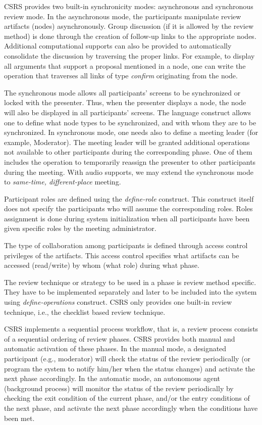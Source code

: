 CSRS provides two built-in synchronicity modes: asynchronous
and synchronous review mode. In the asynchronous mode, the
participants manipulate review artifacts (nodes) asynchronously.
Group discussion (if it is allowed by the review method) is done
through the creation of follow-up links to the appropriate nodes. 
Additional computational supports can
also be provided to automatically consolidate the discussion by 
traversing the proper links. For example, to display all arguments that
support a proposal mentioned in a node, one can write the operation
that traverses all links of type {\it confirm} originating from the
node. 

The synchronous mode allows all participants' screens to be
synchronized or locked with the presenter.
Thus, when the presenter displays a node, the node will also be
displayed in all participants' screens. 
The language construct allows one to define what node types to be
synchronized, and with whom they are to be synchronized. In
synchronous mode, one needs also to define a meeting leader (for
example, Moderator). The meeting leader will be granted additional 
operations not available to other participants during the
corresponding phase. One of them includes the operation to 
temporarily reassign the presenter to other participants during the
meeting. With audio supports, we may extend the synchronous mode to
{\it same-time, different-place} meeting.

Participant roles are defined using the {\it define-role} construct. 
This construct itself does not specify the participants who will
assume the corresponding roles. Roles assignment is  done during system
initialization when all participants have been given specific
roles by the meeting administrator.

The type of collaboration among participants is defined through access
control privileges of the artifacts. This access control specifies
what artifacts can be 
accessed (read/write) by whom (what role) during what phase.

The review technique or strategy to be used in a phase is review
method specific. They have to be implemented
separately and later to be included into the system using {\it
define-operations} construct. 
CSRS only provides one built-in review technique, i.e., the
checklist based review technique.

CSRS implements a sequential process workflow, that is, a
review process consists of a sequential ordering of review phases.
CSRS provides both manual and automatic
activation of these phases. In the manual mode, a designated participant
(e.g., moderator) will check the status of the review periodically (or
program the system to notify him/her when the status changes) and activate
the next phase accordingly. In the automatic mode, an autonomous agent
(background process) will monitor the status of the review
periodically by checking the exit condition of the current phase, and/or
the entry conditions of the next phase, and activate the next phase
accordingly when the conditions have been met.

